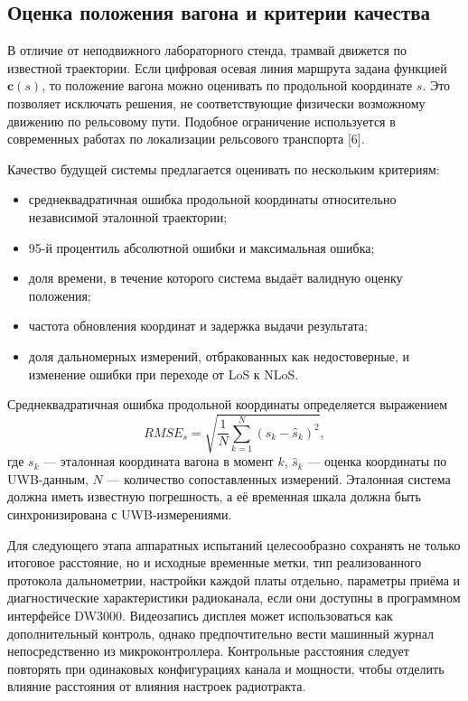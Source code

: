 \documentclass{misisarticle}
\begin{document}
\subsection{Оценка положения вагона и критерии качества}

В отличие от неподвижного лабораторного стенда, трамвай движется по известной траектории. Если цифровая осевая линия маршрута задана функцией \(\mathbf{c}(s)\), то положение вагона можно оценивать по продольной координате \(s\). Это позволяет исключать решения, не соответствующие физически возможному движению по рельсовому пути. Подобное ограничение используется в современных работах по локализации рельсового транспорта [6].

Качество будущей системы предлагается оценивать по нескольким критериям:
\begin{itemize}
    \item среднеквадратичная ошибка продольной координаты относительно независимой эталонной траектории;
    \item 95-й процентиль абсолютной ошибки и максимальная ошибка;
    \item доля времени, в течение которого система выдаёт валидную оценку положения;
    \item частота обновления координат и задержка выдачи результата;
    \item доля дальномерных измерений, отбракованных как недостоверные, и изменение ошибки при переходе от LoS к NLoS.
\end{itemize}

Среднеквадратичная ошибка продольной координаты определяется выражением
\begin{equation}
    RMSE_s=\sqrt{\frac{1}{N}\sum_{k=1}^{N}
    (s_k-\widehat s_k)^2},
\end{equation}
где \(s_k\) — эталонная координата вагона в момент \(k\), \(\widehat s_k\) — оценка координаты по UWB-данным, \(N\) — количество сопоставленных измерений. Эталонная система должна иметь известную погрешность, а её временная шкала должна быть синхронизирована с UWB-измерениями.

Для следующего этапа аппаратных испытаний целесообразно сохранять не только итоговое расстояние, но и исходные временные метки, тип реализованного протокола дальнометрии, настройки каждой платы отдельно, параметры приёма и диагностические характеристики радиоканала, если они доступны в программном интерфейсе DW3000. Видеозапись дисплея может использоваться как дополнительный контроль, однако предпочтительно вести машинный журнал непосредственно из микроконтроллера. Контрольные расстояния следует повторять при одинаковых конфигурациях канала и мощности, чтобы отделить влияние расстояния от влияния настроек радиотракта.
\end{document}
